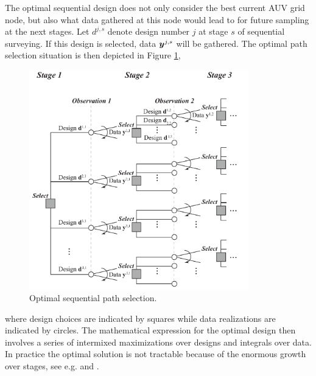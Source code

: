 \documentclass[aoas]{imsart}
\begin{document}
The optimal sequential design does not only consider the best current AUV grid node, but also what data gathered at this node would lead to for future sampling at the next stages. 
Let $d^{j,s}$ denote design number $j$ at stage $s$ of sequential surveying. If this design is selected, data ${\boldsymbol y}^{j,s}$ will be gathered. The optimal path selection situation is then depicted in Figure \ref{fig:PathSelOpt}, 
\begin{figure}[h!]
\centering
\includegraphics[width=0.85\textwidth]{Figures/sequent_select.pdf}
\caption{Optimal sequential path selection.}\label{fig:PathSelOpt}
\end{figure}
where design choices are indicated by squares while data realizations are indicated by circles. 
The mathematical expression for the optimal design then involves a series of intermixed maximizations over designs and integrals over data.
In practice the optimal solution is not tractable because of the enormous growth over stages, see e.g. \cite{sucar2015probabilistic} and \cite{powell2016perspectives}. 
\end{document}
